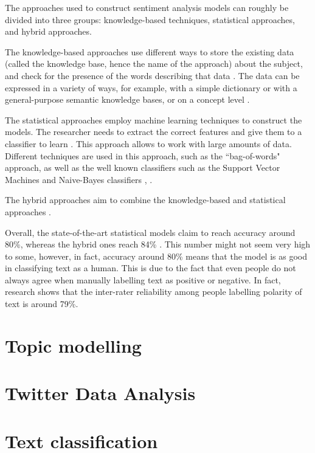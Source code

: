 The approaches used to construct sentiment analysis models can roughly be divided into three groups: knowledge-based techniques, statistical approaches, and hybrid approaches. 

The knowledge-based approaches use different ways to store the existing data (called the knowledge base, hence the name of the approach) about the subject, and check for the presence of the words describing that data \cite{chaumartin2007upar7}. The data can be expressed in a variety of ways, for example, with a simple dictionary or with a general-purpose semantic knowledge bases, or on a concept level \cite{cambria2013knowledge}. 

The statistical approaches employ machine learning techniques to construct the models. The researcher needs to extract the correct features and give them to a classifier to learn \cite{cambria2013statistical}. This approach allows to work with large amounts of data. Different techniques are used in this approach, such as the ``bag-of-words" approach, as well as the well known classifiers such as the Support Vector Machines and Naive-Bayes classifiers \cite{mullen2004sentiment}, \cite{tan2009adapting}.

The hybrid approaches aim to combine the knowledge-based and statistical approaches \cite{ghiassi2013twitter}. 

Overall, the state-of-the-art statistical models claim to reach accuracy around 80\%, whereas the hybrid ones reach 84\% \cite{thakkar2015approaches}. This number might not seem very high to some, however, in fact, accuracy around 80\% means that the model is as good in classifying text as a human. This is due to the fact that even people do not always agree when manually labelling text as positive or negative. In fact, research shows that the inter-rater reliability among people labelling polarity of text is around 79\%. 

\section{Topic modelling}
\label{sec:topic_modelling}

\section{Twitter Data Analysis}
\label{sec:twitter_analysis}

\section{Text classification}
\label{sec:text_classification}

 
 